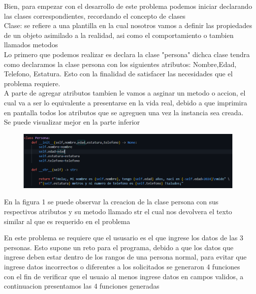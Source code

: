 \documentclass[12pt]{article}
\begin{document}
Bien, para empezar con el desarrollo de este problema podemos iniciar declarando las clases correspondientes, recordando el concepto de clases\\
\textsf{Clase: } se refiere a una plantilla en la cual nosotros vamos a definir las propiedades de un objeto asimilado a la realidad, asi como el comportamiento o tambien llamados  metodos
\\
Lo primero que podemos realizar es declara la clase "persona" dichca clase tendra como declaramos la clase persona con los siguientes atributos: Nombre,Edad, Telefono, Estatura. Esto con la finalidad de satisfacer las necesidades que el problema requiere.\\
A parte de agregar atributos tambien le vamos a asginar un metodo o accion, el cual va a ser lo equivalente a presentarse en la vida real, debido a que imprimira en pantalla todos los atributos que se agreguen una vez la instancia sea creada. Se puede visualizar mejor en la parte inferior \\






\begin{figure}[H]
		\begin{center}
 			\includegraphics[width = .8\textwidth]{01.png}
 			
		\end{center} 
\end{figure}
	
En la figura 1 se puede observar la creacion de la clase persona con sus respectivos atributos  y su metodo llamado str el cual nos devolvera el texto similar al que es requerido en el problema
	


En este problema se requiere que el ususario es el que ingrese los datos de las 3 personas. Esto supone un reto para el programa, debido a que los datos que ingrese deben estar dentro de los rangos de una persona normal, para evitar que ingrese datos incorrectos o diferentes a los solicitados se generaron 4 funciones con el fin de verificar que el usuaio al menos ingrese datos en campos validos, a continuacion presentamos las 4 funciones generadas
\end{document}
